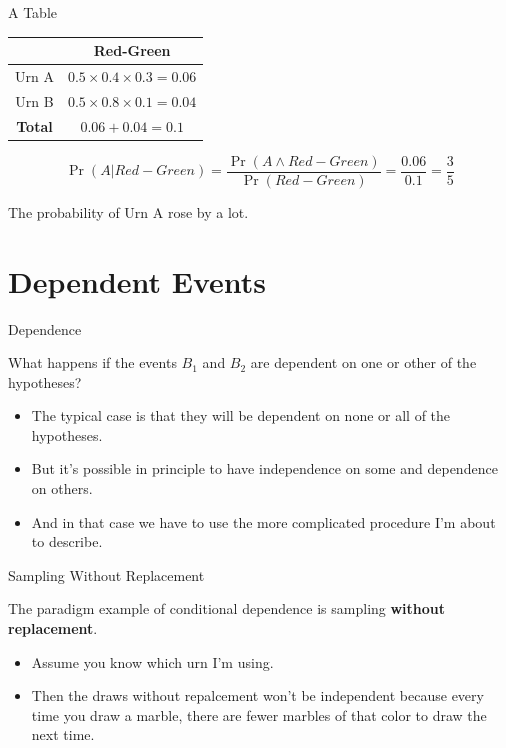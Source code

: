 \documentclass[
  ignorenonframetext,
]{beamer}
\providecommand{\tightlist}{%
  \setlength{\itemsep}{0pt}\setlength{\parskip}{0pt}}
\renewcommand{\,}{\text{, }}
\begin{document}
\begin{frame}{A Table}
\protect\hypertarget{a-table-2}{}

\begin{longtable}[]{@{}cc@{}}
\toprule
& Red-Green\tabularnewline
\midrule
\endhead
Urn A & \(0.5 \times 0.4 \times 0.3 = 0.06\)\tabularnewline
Urn B & \(0.5 \times 0.8 \times 0.1 = 0.04\)\tabularnewline
\textbf{Total} & \(0.06 + 0.04 = 0.1\)\tabularnewline
\bottomrule
\end{longtable}

\pause

\[
\Pr(A | Red-Green) = \frac{\Pr(A \wedge Red-Green)}{\Pr(Red-Green)} = \frac{0.06}{0.1} = \frac{3}{5}
\]

The probability of Urn A rose by a lot.

\end{frame}

\hypertarget{dependent-events}{%
\section{Dependent Events}\label{dependent-events}}

\begin{frame}{Dependence}
\protect\hypertarget{dependence}{}

What happens if the events \(B_1\) and \(B_2\) are dependent on one or
other of the hypotheses?

\begin{itemize}
\tightlist
\item
  The typical case is that they will be dependent on none or all of the
  hypotheses.
\item
  But it's possible in principle to have independence on some and
  dependence on others.
\item
  And in that case we have to use the more complicated procedure I'm
  about to describe.
\end{itemize}

\end{frame}

\begin{frame}{Sampling Without Replacement}
\protect\hypertarget{sampling-without-replacement}{}

The paradigm example of conditional dependence is sampling
\textbf{without replacement}.

\begin{itemize}
\tightlist
\item
  Assume you know which urn I'm using.
\item
  Then the draws without repalcement won't be independent because every
  time you draw a marble, there are fewer marbles of that color to draw
  the next time.
\end{itemize}

\end{frame}
\end{document}
